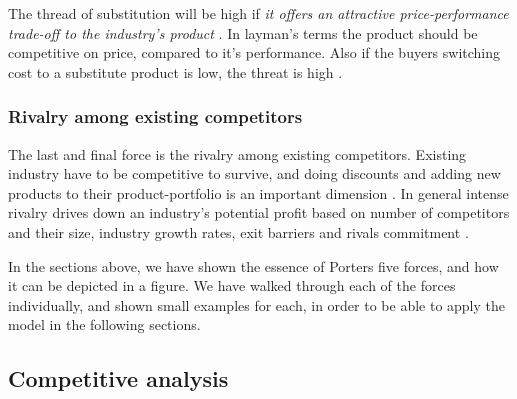 The thread of substitution will be high if \emph{it offers an attractive price-performance trade-off to the industry's product} \cite[p.~84]{porter2008five}. In layman's terms the product should be competitive on price, compared to it's performance. Also if the buyers switching cost to a substitute product is low, the threat is high \cite[p.~84]{porter2008five}.

\subsubsection*{Rivalry among existing competitors}
The last and final force is the rivalry among existing competitors. Existing industry have to be competitive to survive, and doing discounts and adding new products to their product-portfolio is an important dimension \cite[p.~85]{porter2008five}. In general intense rivalry drives down an industry's potential profit based on number of competitors and their size, industry growth rates, exit barriers and rivals commitment \cite[p.~85]{porter2008five}. 


In the sections above, we have shown the essence of Porters five forces, and how it can be depicted in a figure. We have walked through each of the forces individually, and shown small examples for each, in order to be able to apply the model in the following sections.


















\subsection{Competitive analysis}








% 

